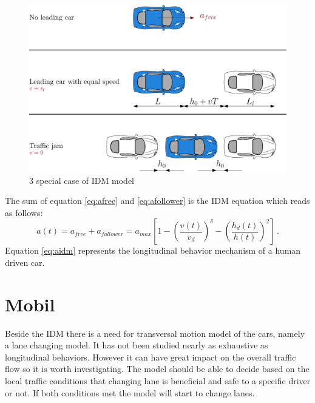 \documentclass[a4paper,12pt,twoside]{report}
\begin{document}
			\begin{figure}[ht]
				\centering
				\includegraphics[width=.8\textwidth]{idm.eps}
				\caption{3 special case of IDM model}
				\label{fig:idm}
			\end{figure}
			The sum of equation \ref{eq:afree} and \ref{eq:afollower} is the IDM equation which reads as follows:
			\begin{equation}
				a(t)=a_{free}+a_{follower}=a_{max}\left [ 1 - \left ( \frac{v(t)}{v_d} \right )^\delta - \left ( \frac{h_d(t)}{h(t)} \right )^2 \right ]\,.
				\label{eq:aidm}
			\end{equation}
			Equation \ref{eq:aidm} represents the longitudinal behavior mechanism of a human driven car.
		\section{Mobil} \label{sec:MOBIL}
			Beside the IDM there is a need for transversal motion model of the cars, namely a lane changing model. It has not been studied nearly as exhaustive as longitudinal behaviors. However it can have great impact on the overall traffic flow so it is worth investigating. The model should be able to decide based on the local traffic conditions that changing lane is beneficial and safe to a specific driver or not. If both conditions met the model will start to change lanes.
\end{document}
